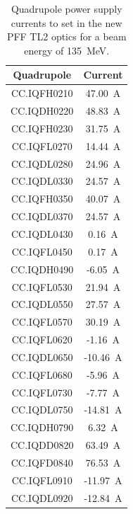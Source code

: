 \begin{table}
  \begin{center}
    \begin{tabular}{|c c|}
	    \hline
        Quadrupole & Current \\ \hline
		CC.IQFH0210 &	47.00~A \\
		CC.IQDH0220 &	48.83~A \\
		CC.IQFH0230 &	31.75~A \\
		CC.IQFL0270 &	14.44~A \\
		CC.IQDL0280 &	24.96~A \\
		CC.IQDL0330 &	24.57~A \\
		CC.IQFH0350 &	40.07~A \\
		CC.IQDL0370 &	24.57~A \\
		CC.IQDL0430 &	0.16~A \\
		CC.IQFL0450 &	0.17~A \\
		CC.IQDH0490 &	-6.05~A \\
		CC.IQFL0530 &	21.94~A \\
		CC.IQDL0550 &	27.57~A \\
		CC.IQFL0570 &	30.19~A \\
		CC.IQFL0620 &	-1.16~A \\
		CC.IQDL0650 &	-10.46~A \\
		CC.IQFL0680 &	-5.96~A \\
		CC.IQFL0730 &	-7.77~A \\
		CC.IQDL0750 &	-14.81~A \\
		CC.IQDH0790 &	6.32~A \\
		CC.IQDD0820 &	63.49~A \\
		CC.IQFD0840 &	76.53~A \\
		CC.IQFL0910 &	-11.97~A \\
		CC.IQDL0920 &	-12.84~A \\
	   \hline
    \end{tabular}
    \caption{Quadrupole power supply currents to set in the new PFF TL2 optics for a beam energy of 135~MeV.}
  	\label{t:pffOpticsQuads}
  \end{center}
\end{table}

